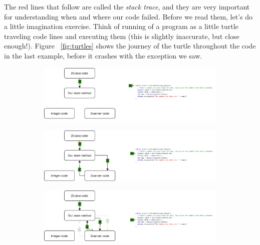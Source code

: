 The red lines that follow are called the \emph{stack trace}, and they are very important for understanding when and where our code failed. Before we read them, let's do a little imagination exercise. Think of running of a program as a little turtle traveling code lines and executing them (this is slightly inaccurate, but close enough!). Figure ~\ref{fig:turtles} shows the journey of the turtle throughout the code in the last example, before it crashes with the exception we saw. 

\begin{figure}[h!]
\begin{subfigure}{1\textwidth}
  \centering
  \includegraphics[width=1\textwidth]{images/code_turtle_1.png}
  \caption{}
  \label{fig:sturtle1}
\end{subfigure}%

\begin{subfigure}{1\textwidth}
  \centering
  \includegraphics[width=1\textwidth]{images/code_turtle_2.png}
  \caption{}
  \label{fig:sturtle2}
\end{subfigure}%

\begin{subfigure}{1.\textwidth}
  \centering
  \includegraphics[width=1\textwidth]{images/code_turtle_3.png}
  \caption{}
  \label{fig:sturtle3}
\end{subfigure}%


\end{figure}
